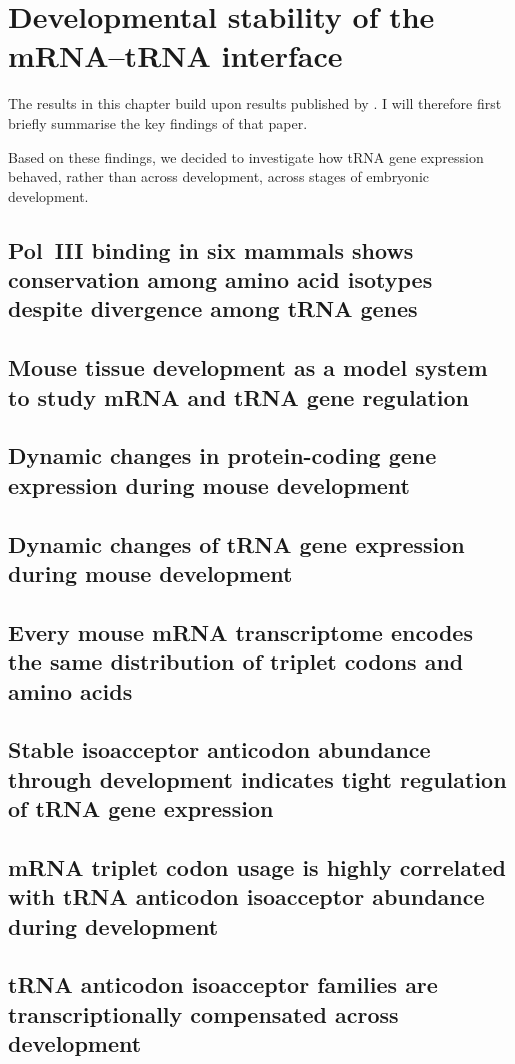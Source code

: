 \chapter{Developmental stability of the mRNA–tRNA interface}

The results in this chapter build upon results published by
\citet{Kutter:2011}. I will therefore first briefly summarise the key findings
of that paper.

Based on these findings, we decided to investigate how tRNA gene expression
behaved, rather than across development, across stages of embryonic
development.

\section{Pol~III binding in six mammals shows conservation among amino acid
isotypes despite divergence among tRNA genes}

\section{Mouse tissue development as a model system to study mRNA and tRNA gene
regulation}

\section{Dynamic changes in protein-coding gene expression during mouse
development}

\section{Dynamic changes of tRNA gene expression during mouse development}

\section{Every mouse mRNA transcriptome encodes the same distribution of
triplet codons and amino acids}

\section{Stable isoacceptor anticodon abundance through development indicates
tight regulation of tRNA gene expression}

\section{mRNA triplet codon usage is highly correlated with tRNA anticodon
isoacceptor abundance during development}

\section{tRNA anticodon isoacceptor families are transcriptionally compensated
across development}
